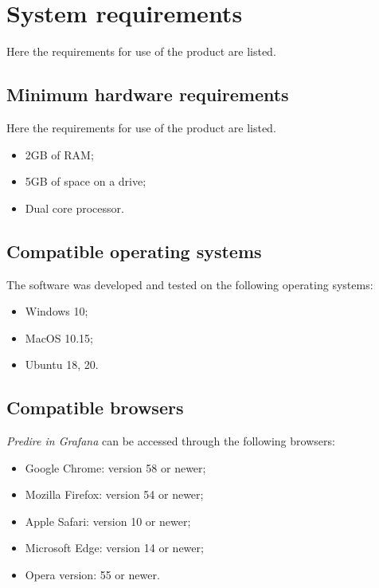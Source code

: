 \section{System requirements}
Here the requirements for use of the product are listed.

\subsection{Minimum hardware requirements}
Here the requirements for use of the product are listed.
\begin{itemize}
	\item 2GB of RAM;
	\item 5GB of space on a drive;
	\item Dual core processor.	
\end{itemize}

\subsection{Compatible operating systems}
The software was developed and tested on the following operating systems:
\begin{itemize}
	\item Windows 10;
	\item MacOS 10.15;
	\item Ubuntu 18, 20.
\end{itemize}

\subsection{Compatible browsers}
\textit{Predire in Grafana} can be accessed through the following browsers:
\begin{itemize}
	\item Google Chrome: version 58 or newer;
	\item Mozilla Firefox: version 54 or newer;
	\item Apple Safari: version 10 or newer;
	\item Microsoft Edge: version 14 or newer;
	\item Opera version: 55 or newer.
\end{itemize}



